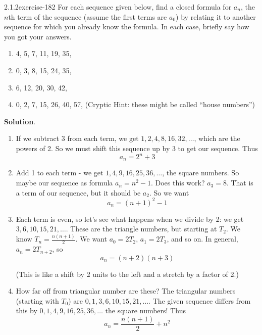 \documentclass[twoside,11pt,]{book}
\numberwithin{equation}{chapter}
\begin{document}
\begin{divisionsolution}{2.1.2}{}{exercise-182}%
\hypertarget{p-2996}{}%
For each sequence given below, find a closed formula for \(a_n\), the \(n\)th term of the sequence (assume the first terms are \(a_0\)) by relating it to another sequence for which you already know the formula. In each case, briefly say how you got your answers.\leavevmode%
\begin{enumerate}[label=(\alph*)]
\item\hypertarget{li-1756}{}\hypertarget{p-2997}{}%
4, 5, 7, 11, 19, 35, \textellipsis{}%
\item\hypertarget{li-1757}{}\hypertarget{p-2998}{}%
0, 3, 8, 15, 24, 35, \textellipsis{}%
\item\hypertarget{li-1758}{}\hypertarget{p-2999}{}%
6, 12, 20, 30, 42, \textellipsis{}%
\item\hypertarget{li-1759}{}\hypertarget{p-3000}{}%
0, 2, 7, 15, 26, 40, 57, \textellipsis{} (Cryptic Hint: these might be called ``house numbers'')%
\end{enumerate}
%
\par\smallskip%
\noindent\textbf{Solution}.\quad%
\hypertarget{p-3001}{}%
\leavevmode%
\begin{enumerate}[label=(\alph*)]
\item\hypertarget{li-1760}{}\hypertarget{p-3002}{}%
If we subtract 3 from each term, we get \(1, 2, 4, 8, 16, 32, \ldots\), which are the powers of 2. So we must shift this sequence up by 3 to get our sequence. Thus%
\begin{equation*}
a_n = 2^n + 3
\end{equation*}
%
\item\hypertarget{li-1761}{}\hypertarget{p-3003}{}%
Add 1 to each term - we get \(1, 4, 9, 16, 25, 36, \ldots\), the square numbers. So maybe our sequence as formula \(a_n = n^2 - 1\). Does this work? \(a_3 = 8\). That is a term of our sequence, but it should be \(a_2\). So we want%
\begin{equation*}
a_n = (n+1)^2 - 1
\end{equation*}
%
\item\hypertarget{li-1762}{}\hypertarget{p-3004}{}%
Each term is even, so let's see what happens when we divide by 2: we get \(3, 6, 10, 15, 21,\ldots\). These are the triangle numbers, but starting at \(T_2\). We know \(T_n = \frac{n(n+1)}{2}\). We want \(a_0 = 2T_2\), \(a_1 = 2T_3\), and so on. In general, \(a_n = 2T_{n+2}\), so%
\begin{equation*}
a_n = (n+2)(n+3)
\end{equation*}
%
\par
\hypertarget{p-3005}{}%
(This is like a shift by 2 units to the left and a stretch by a factor of 2.)%
\item\hypertarget{li-1763}{}\hypertarget{p-3006}{}%
How far off from triangular number are these? The triangular numbers (starting with \(T_0\)) are \(0, 1, 3, 6, 10, 15, 21, \ldots\). The given sequence differs from this by \(0, 1, 4, 9, 16, 25, 36, \ldots\) the square numbers! Thus%
\begin{equation*}
a_n = \frac{n(n+1)}{2} + n^2
\end{equation*}
%
\end{enumerate}
%
\end{divisionsolution}%
\end{document}
